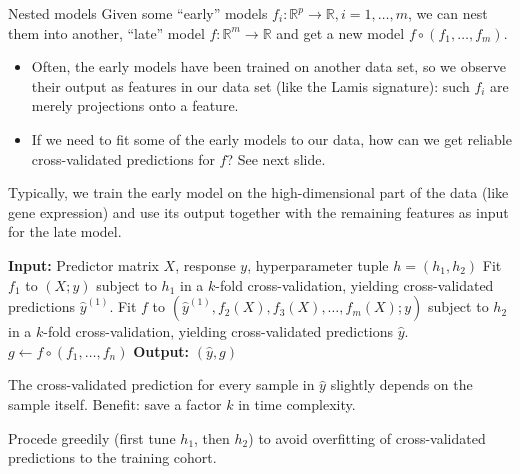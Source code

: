 \documentclass[10pt, aspectratio=169]{beamer}
\def\RR{\mathbb{R}}
\begin{document}
\begin{frame}{Nested models}
  Given some ``early'' models $f_i: \RR^p \to \RR, i = 1, \ldots, m$, we can nest 
  them into another, ``late'' model $f: \RR^m \to \RR$ and get a new model 
  $f \circ (f_1, \ldots, f_m)$.

  \begin{itemize}
    \item Often, the early models have been trained on another data set, so we 
      observe their output as features in our data set (like the Lamis 
      signature): such $f_i$ are merely projections onto a feature.
    \item If we need to fit some of the early models to our data, how can we 
      get reliable cross-validated predictions for $f$? See next slide.
  \end{itemize}

  Typically, we train the early  model on the high-dimensional 
  part of the data (like gene expression) and use its output together with the 
  remaining features as input for the late model.
\end{frame}

\begin{frame}{}
  \begin{algorithm}[H]
    \caption{Nested pseudo cross validation} \label{alg:nested-pcv}
    \begin{algorithmic}[1]
      \State \textbf{Input:} Predictor matrix $X$, response $y$, 
        hyperparameter tuple $h = (h_1, h_2)$
      \State Fit $f_1$ to $(X; y)$ subject to $h_1$ in a $k$-fold cross-validation, 
        yielding cross-validated predictions $\hat{y}^{(1)}$.
      \State Fit $f$ to $(\hat{y}^{(1)}, f_2(X), f_3(X), \ldots, f_m(X); y)$ 
        subject to $h_2$ in a $k$-fold cross-validation, yielding 
        cross-validated predictions $\hat{y}$.
      \State $g \gets f \circ (f_1, \ldots, f_n)$
      \State \textbf{Output:} $(\hat{y}, g)$
    \end{algorithmic}
  \end{algorithm}

The  cross-validated prediction for every sample in $\hat{y}$ slightly 
depends on the sample itself. Benefit: save a factor $k$ in time complexity.

Procede greedily (first tune $h_1$, then $h_2$) to avoid 
overfitting of cross-validated predictions to the training cohort.
\end{frame}

\end{document}
